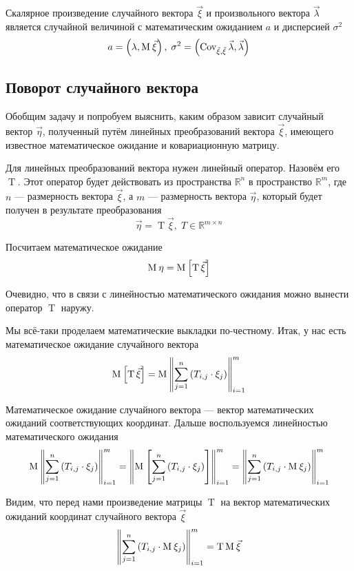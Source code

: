 \begin{affirmation}\label{affirmation:scalarMulTransformations}
  Скалярное произведение случайного вектора $\vec{\xi}$ и произвольного
  вектора $\vec{\lambda}$ является случайной величиной с математическим
  ожиданием $a$ и дисперсией $\sigma^2$
  $$a = \left( \lambda, \operatorname{M}_{} \vec{\xi} \right),\;
      \sigma^2
      = \left( \operatorname{Cov^{}_{\vec{\xi}, \vec{\xi}}} \vec{\lambda}, \vec{\lambda} \right)$$
\end{affirmation}

\subsection{Поворот случайного вектора}
Обобщим задачу и попробуем выяснить, каким образом зависит случайный вектор
$\vec{\eta}$, полученный путём линейных преобразований вектора $\vec{\xi}$,
имеющего известное математическое ожидание и ковариационную матрицу.

Для линейных преобразований вектора нужен линейный оператор. Назовём его
$\operatorname{T}$. Этот оператор будет действовать из пространства
$\mathbb{R}^n$
в пространство $\mathbb{R}^m$, где $n$ --- размерность вектора $\vec{\xi}$,
а $m$ --- размерность вектора $\vec{\eta}$, который будет получен
в результате преобразования
$$\vec{\eta} = \operatorname{T} \vec{\xi} ,\; T \in \mathbb{R}^{m \times n}$$

Посчитаем математическое ожидание
$$\operatorname{M}_{} \eta = \operatorname{M}_{} \left[ \operatorname{T} \vec{\xi}  \right]$$

Очевидно, что в связи с линейностью математического ожидания можно вынести
оператор $\operatorname{T}$ наружу.

Мы всё-таки проделаем математические выкладки по-честному.
Итак, у нас есть математическое ожидание случайного вектора
$$\operatorname{M}_{} \left[ \operatorname{T} \vec{\xi}  \right]
  = \operatorname{M}_{} \left\| \sum_{j=1}^n \left( T_{i,j} \cdot \xi_j \right)
      \right\|_{i=1}^m$$

Математическое ожидание случайного вектора --- вектор математических ожиданий
соответствующих координат.
Дальше воспользуемся линейностью математического ожидания
$$\operatorname{M}_{} \left\| \sum_{j=1}^n \left( T_{i,j} \cdot \xi_j \right)
      \right\|_{i=1}^m
  = \left\| \operatorname{M}_{} \left[ \sum_{j=1}^n \left( T_{i,j} \cdot \xi_j \right) \right]
      \right\|_{i=1}^m
  = \left\| \sum_{j=1}^n \left( T_{i,j} \cdot \operatorname{M}_{} \xi_j \right)
      \right\|_{i=1}^m$$

Видим, что перед нами произведение матрицы $\operatorname{T}$ на вектор
математических ожиданий координат случайного вектора $\vec{\xi}$
$$\left\| \sum_{j=1}^n \left( T_{i,j} \cdot \operatorname{M}_{} \xi_j \right)
  \right\|_{i=1}^m = \operatorname{T} \operatorname{M}_{} \vec{\xi} $$

